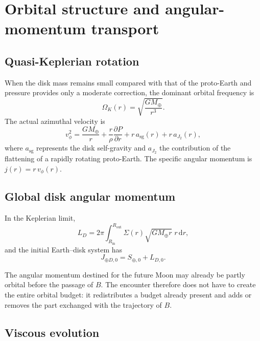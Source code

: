 \documentclass[11pt,a4paper,openany]{report}
\newcommand{\Mt}{M_{\oplus}}
\newcommand{\dd}{\mathrm{d}}
\begin{document}
\section{Orbital structure and angular-momentum transport}
\subsection{Quasi-Keplerian rotation}

When the disk mass remains small compared with that of the proto-Earth and pressure provides only
a moderate correction, the dominant orbital frequency is
\begin{equation}
\Omega_K(r)=\sqrt{\frac{G\Mt}{r^3}}.
\label{eq:OmegaK}
\end{equation}
The actual azimuthal velocity is
\begin{equation}
v_\phi^2=\frac{G\Mt}{r}+\frac{r}{\rho}\frac{\partial P}{\partial r}+r\,a_{\mathrm{sg}}(r)
+r\,a_{J_2}(r),
\label{eq:vphi}
\end{equation}
where $a_{\mathrm{sg}}$ represents the disk self-gravity and $a_{J_2}$ the contribution of the
flattening of a rapidly rotating proto-Earth. The specific angular momentum is $j(r)=r\,v_\phi(r)$.

\subsection{Global disk angular momentum}

In the Keplerian limit,
\begin{equation}
L_D=2\pi\int_{R_{\mathrm{in}}}^{R_{\mathrm{out}}}\Sigma(r)\sqrt{G\Mt r}\;r\,\dd r,
\label{eq:LD}
\end{equation}
and the initial Earth--disk system has
\begin{equation}
J_{\oplus D,0}=S_{\oplus,0}+L_{D,0}.
\label{eq:J0}
\end{equation}

\begin{ideephys}
The angular momentum destined for the future Moon may already be partly orbital before the passage
of $B$. The encounter therefore does not have to create the entire orbital budget: it redistributes
a budget already present and adds or removes the part exchanged with the trajectory of $B$.
\end{ideephys}

\subsection{Viscous evolution}
\end{document}
